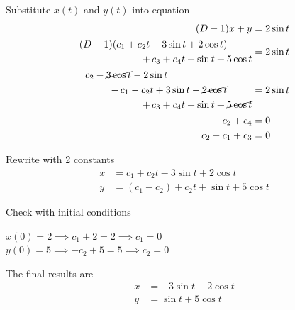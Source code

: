 \documentclass[12pt,final]{novelette} %
\begin{document}
\begin{question}[resume]
    Substitute $x(t)$ and $y(t)$ into equation
    \begin{align*}
        (D-1) x + y     & = 2 \sin t \\
        \begin{aligned}
            (D-1) (c_1 + c_2 t - 3 \sin t + 2 \cos t) \hspace*{2.5em} \\
            + \,c_3 + c_4 t + \sin t + 5 \cos t
        \end{aligned}
                        & = 2 \sin t \\
        \begin{aligned}
            c_2 - \cancel{3 \cos t} - 2 \sin t \hspace*{8.5em}             \\
            - \,c_1 - c_2 t + 3 \sin t - \cancel{2 \cos t} \hspace*{2.5em} \\
            + \,c_3 + c_4 t + \sin t + \cancel{5 \cos t}
        \end{aligned}
                        & = 2 \sin t \\
        - c_2 +c_4      & = 0        \\
        c_2 - c_1 + c_3 & = 0        \\
    \end{align*}

    \vspace{-1em}

    Rewrite with 2 constants
    \begin{align*}
        x & = c_1 + c_2 t - 3 \sin t + 2 \cos t       \\
        y & = (c_1 - c_2) + c_2 t + \sin t + 5 \cos t
    \end{align*}

    Check with initial conditions
    \begin{center}
        $x(0) = 2 \implies c_1 + 2 = 2 \implies c_1 = 0$ \\[.5em]
        $y(0) = 5 \implies -c_2 + 5 = 5 \implies c_2 = 0$
    \end{center}

    The final results are
    \medskip
    \[
        \boxed{
            \begin{aligned}
                x & = -3 \sin t + 2 \cos t \\
                y & = \sin t + 5 \cos t
            \end{aligned}
        }
    \]

\end{question}
\end{document}

